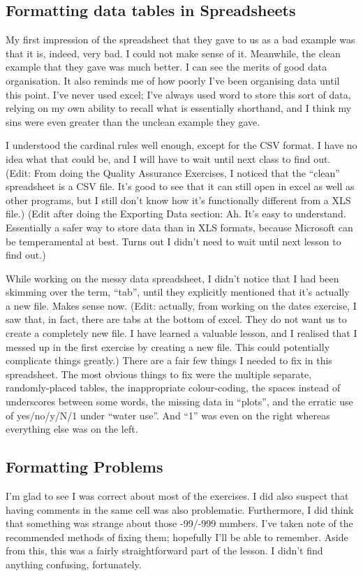 \documentclass{article}
\begin{document}
\subsection{Formatting data tables in Spreadsheets}
My first impression of the spreadsheet that they gave to us as a bad example was that it is, indeed, very bad. I could not make sense of it. Meanwhile, the clean example that they gave was much better. I can see the merits of good data organisation. It also reminds me of how poorly I’ve been organising data until this point. I’ve never used excel; I’ve always used word to store this sort of data, relying on my own ability to recall what is essentially shorthand, and I think my sins were even greater than the unclean example they gave.

I understood the cardinal rules well enough, except for the CSV format. I have no idea what that could be, and I will have to wait until next class to find out. (Edit: From doing the Quality Assurance Exercises, I noticed that the “clean” spreadsheet is a CSV file. It’s good to see that it can still open in excel as well as other programs, but I still don’t know how it’s functionally different from a XLS file.) (Edit after doing the Exporting Data section: Ah. It’s easy to understand. Essentially a safer way to store data than in XLS formats, because Microsoft can be temperamental at best. Turns out I didn’t need to wait until next lesson to find out.)

While working on the messy data spreadsheet, I didn’t notice that I had been skimming over the term, “tab”, until they explicitly mentioned that it’s actually a new file. Makes sense now. (Edit: actually, from working on the dates exercise, I saw that, in fact, there are tabs at the bottom of excel. They do not want us to create a completely new file. I have learned a valuable lesson, and I realised that I messed up in the first exercise by creating a new file. This could potentially complicate things greatly.) There are a fair few things I needed to fix in this spreadsheet. The most obvious things to fix were the multiple separate, randomly-placed tables, the inappropriate colour-coding, the spaces instead of underscores between some words, the missing data in “plots”, and the erratic use of yes/no/y/N/1 under “water use”. And “1” was even on the right whereas everything else was on the left.
\subsection{Formatting Problems}
I’m glad to see I was correct about most of the exercises. I did also suspect that having comments in the same cell was also problematic. Furthermore, I did think that something was strange about those -99/-999 numbers. I’ve taken note of the recommended methods of fixing them; hopefully I’ll be able to remember. Aside from this, this was a fairly straightforward part of the lesson. I didn’t find anything confusing, fortunately.
\end{document}
